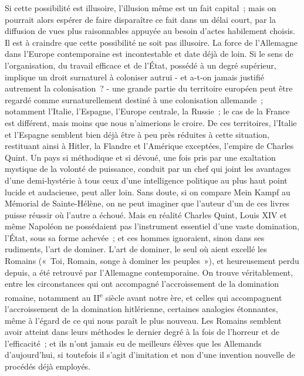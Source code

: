 \documentclass[french,twoside]{book} %
\begin{document}
Si cette possibilité est illusoire, l'illusion même est un fait capital ; mais on pourrait alors espérer de faire disparaître ce fait dans un délai court, par la diffusion de vues plus raisonnables appuyée au besoin d'actes habilement choisis. Il est à craindre que cette possibilité ne soit pas illusoire. La force de l'Allemagne dans l'Europe contemporaine est incontestable et date déjà de loin. Si le sens de l'organisation, du travail efficace et de l'État, possédé à un degré supérieur, implique un droit surnaturel à coloniser autrui - et a-t-on jamais justifié autrement la colonisation ? - une grande partie du territoire européen peut être regardé comme surnaturellement destiné à une colonisation allemande ; notamment l'Italie, l'Espagne, l'Europe centrale, la Russie ; le cas de la France est différent, mais moins que nous n'aimerions le croire. De ces territoires, l'Italie et l'Espagne semblent bien déjà être à peu près réduites à cette situation, restituant ainsi à Hitler, la Flandre et l'Amérique exceptées, l'empire de Charles Quint. Un pays si méthodique et si dévoué, une fois pris par une exaltation mystique de la volonté de puissance, conduit par un chef qui joint les avantages d'une demi-hystérie à tous ceux d'une intelligence politique au plus haut point lucide et audacieuse, peut aller loin. Sans doute, si on compare Mein Kampf au Mémorial de Sainte-Hélène, on ne peut imaginer que l'auteur d'un de ces livres puisse réussir où l'autre a échoué. Mais en réalité Charles Quint, Louis XIV et même Napoléon ne possédaient pas l'instrument essentiel d'une vaste domination, l'État, sous sa forme achevée ; et ces hommes ignoraient, sinon dans ses rudiments, l'art de dominer. L'art de dominer, le seul où aient excellé les Romains (« Toi, Romain, songe à dominer les peuples »), et heureusement perdu depuis, a été retrouvé par l'Allemagne contemporaine. On trouve véritablement, entre les circonstances qui ont accompagné l'accroissement de la domination romaine, notamment au II\textsuperscript{e} siècle avant notre ère, et celles qui accompagnent l'accroissement de la domination hitlérienne, certaines analogies étonnantes, même à l'égard de ce qui nous paraît le plus nouveau. Les Romains semblent avoir atteint dans leurs méthodes le dernier degré à la fois de l'horreur et de l'efficacité ; et ils n'ont jamais eu de meilleurs élèves que les Allemands d'aujourd'hui, si toutefois il s'agit d'imitation et non d'une invention nouvelle de procédés déjà employés.\par
\end{document}

